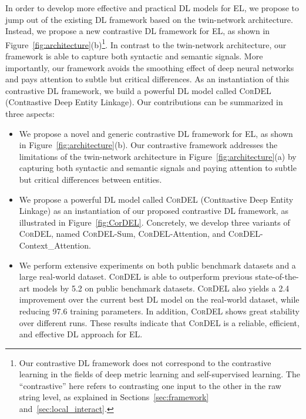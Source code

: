 \documentclass[conference]{IEEEtran}
\begin{document}
In order to develop more effective and practical DL models for EL, we propose to jump out of the existing DL framework based on the twin-network architecture. Instead, we propose a new contrastive DL framework for EL, as shown in Figure~\ref{fig:architecture}(b)\footnote{Our contrastive DL framework does not correspond to the contrastive learning in the fields of deep metric learning and self-supervised learning. The ``contrastive'' here refers to contrasting one input to the other in the raw string level, as explained in Sections~\ref{sec:framework} and~\ref{sec:local_interact}.}. In contrast to the twin-network architecture, our framework is able to capture both syntactic and semantic signals. More importantly, our framework avoids the smoothing effect of deep neural networks and pays attention to subtle but critical differences. As an instantiation of this contrastive DL framework, we build a powerful DL model called \textsc{CorDEL} (C\textsc{o}nt\textsc{r}astive Deep Entity Linkage). Our contributions can be summarized in three aspects:
\begin{itemize}
    \item We propose a novel and generic contrastive DL framework for EL, as shown in Figure~\ref{fig:architecture}(b). Our contrastive framework addresses the limitations of the twin-network architecture in Figure~\ref{fig:architecture}(a) by capturing both syntactic and semantic signals and paying attention to subtle but critical differences between entities.
    \item We propose a powerful DL model called \textsc{CorDEL} (C\textsc{o}nt\textsc{r}astive Deep Entity Linkage) as an instantiation of our proposed contrastive DL framework, as illustrated in Figure~\ref{fig:CorDEL}. Concretely, we develop three variants of \textsc{CorDEL}, named \textsc{CorDEL}-Sum, \textsc{CorDEL}-Attention, and \textsc{CorDEL}-Context\_Attention.
    \item We perform extensive experiments on both public benchmark datasets and a large real-world dataset. \textsc{CorDEL} is able to outperform previous state-of-the-art models by 5.2 on public benchmark datasets. \textsc{CorDEL} also yields a 2.4 improvement over the current best DL model on the real-world dataset, while reducing 97.6 training parameters. In addition, \textsc{CorDEL} shows great stability over different runs. These results indicate that \textsc{CorDEL} is a reliable, efficient, and effective DL approach for EL.
\end{itemize}
\end{document}
